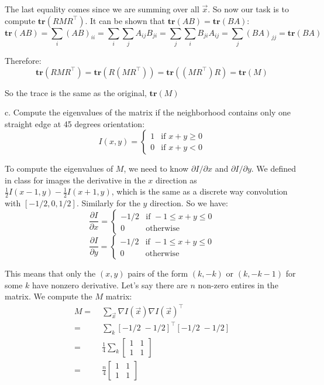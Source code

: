 \documentclass[11pt,english]{article}
\begin{document}
\begin{enumerate}
The last equality comes since we are summing over all $\vec{x}$. 
So now our task is to compute $\mathbf{tr}(R M R^\top)$. It can be shown that $\mathbf{tr}(AB) = \mathbf{tr}(BA)$:
\[ \mathbf{tr}(AB) = \sum_i (AB)_{ii} = \sum_i \sum_j A_{ij} B_{ji}
= \sum_j \sum_i B_{ji} A_{ij} = \sum_j (BA)_{jj} = \mathbf{tr}(BA)  \]

Therefore:
\[ \mathbf{tr}(RMR^\top) = \mathbf{tr}(R(MR^\top)) = \mathbf{tr}((MR^\top)R) = \mathbf{tr}(M) \]

So the trace is the same as the original, $\mathbf{tr}(M)$

c. Compute the eigenvalues of the matrix if the neighborhood contains only one straight edge at 45 degrees orientation:
\[
I(x,y) = \left\{
	\begin{array}{ll}
		1  & \mbox{if } x+y \geq 0 \\
		0 & \mbox{if } x+y < 0
	\end{array}
\right.
\]

To compute the eigenvalues of $M$, we need to know $\partial I / \partial x$ and $\partial I / \partial y$.
We defined in class for images the derivative in the $x$ direction as
$\frac{1}{2} I(x-1,y) - \frac{1}{2} I(x+1,y)$, which is the same as a discrete way convolution with
$[ -1/2, 0, 1/2]$. Similarly for the $y$ direction. So we have:
\[ \frac{\partial I}{\partial x} = \left\{
    \begin{array}{ll}
        -1/2 & \textrm{if } -1 \le x + y \le 0 \\
        0 & \textrm{otherwise}
    \end{array} \right.
\]
\[ \frac{\partial I}{\partial y} = \left\{
    \begin{array}{ll}
        -1/2 & \textrm{if } -1 \le x + y \le 0 \\
        0 & \textrm{otherwise}
    \end{array} \right.
\]

This means that only the $(x,y)$ pairs of the form $(k,-k)$ or $(k,-k-1)$ for some $k$ have nonzero derivative.
Let's say there are $n$ non-zero entires in the matrix. We compute the $M$ matrix:
\begin{align*}
M 
=&\; \sum_{\vec{x}} \nabla I(\vec{x}) \nabla I(\vec{x})^\top \\
=&\; \sum_{k} [-1/2 \; -1/2 ]^\top [ -1/2 \; -1/2 ]  \\
=&\; \frac{1}{4} \sum_{k}
        \begin{bmatrix}
           1 & 1 \\
           1 & 1 
        \end{bmatrix} \\
=&\; \frac{n}{4}  \begin{bmatrix}
           1 & 1 \\
           1 & 1 
        \end{bmatrix} \\
\end{align*}


\end{enumerate}
\end{document}
